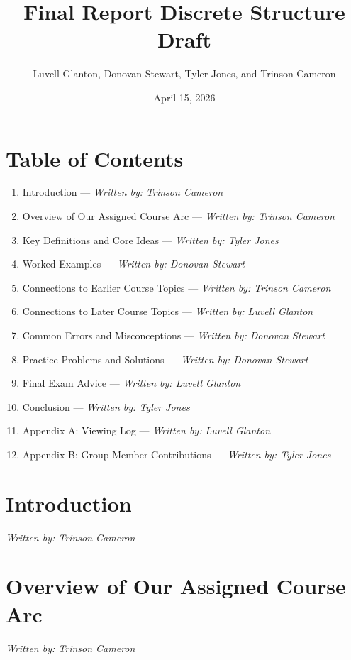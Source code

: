\documentclass[12pt]{article}
\title{Final Report Discrete Structure Draft}
\author{Luvell Glanton, Donovan Stewart, Tyler Jones, and Trinson Cameron}
\date{April 15, 2026}
\begin{document}
\maketitle

\section*{Table of Contents}
\begin{enumerate}
    \item Introduction --- \textit{Written by: Trinson Cameron}
    \item Overview of Our Assigned Course Arc --- \textit{Written by: Trinson Cameron}
    \item Key Definitions and Core Ideas --- \textit{Written by: Tyler Jones}
    \item Worked Examples --- \textit{Written by: Donovan Stewart}
    \item Connections to Earlier Course Topics --- \textit{Written by: Trinson Cameron}
    \item Connections to Later Course Topics --- \textit{Written by: Luvell Glanton}
    \item Common Errors and Misconceptions --- \textit{Written by: Donovan Stewart}
    \item Practice Problems and Solutions --- \textit{Written by: Donovan Stewart}
    \item Final Exam Advice --- \textit{Written by: Luvell Glanton}
    \item Conclusion --- \textit{Written by: Tyler Jones}
    \item Appendix A: Viewing Log --- \textit{Written by: Luvell Glanton}
    \item Appendix B: Group Member Contributions --- \textit{Written by: Tyler Jones}
\end{enumerate}

\newpage

\section{Introduction}
\begin{center}
    \textit{Written by: Trinson Cameron}
\end{center}
\vspace{1em}

\newpage
\section{Overview of Our Assigned Course Arc}
\begin{center}
    \textit{Written by: Trinson Cameron}
\end{center}
\vspace{1em}
\end{document}
